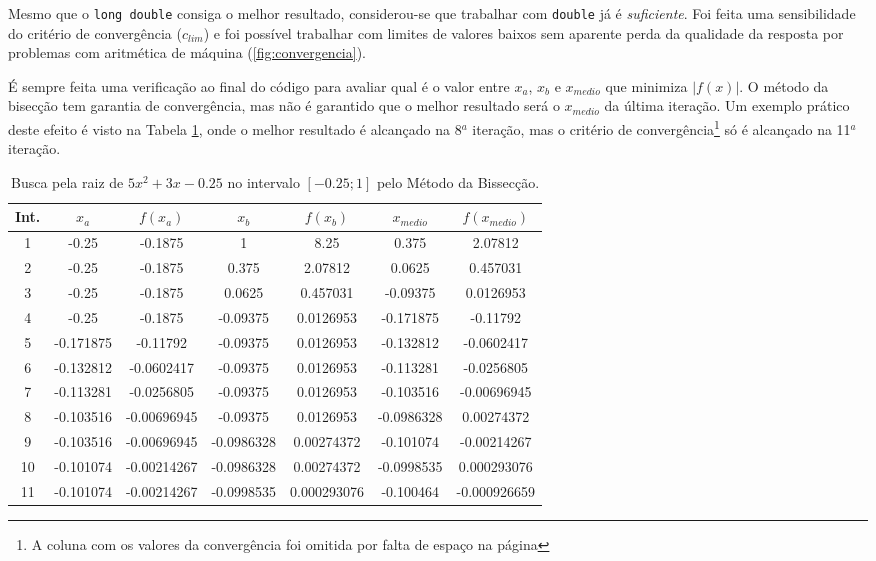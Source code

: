 \documentclass[final,3p,12pt]{elsarticle}
\begin{document}
    Mesmo que o \verb|long double| consiga o melhor resultado, considerou-se que trabalhar com \verb|double| já é \emph{suficiente}. Foi feita uma sensibilidade do critério de convergência ($c_{lim}$) e foi possível trabalhar com limites de valores baixos sem aparente perda da qualidade da resposta por problemas com aritmética de máquina (\ref{fig:convergencia}).

    É sempre feita uma verificação ao final do código para avaliar qual é o valor entre $x_a$, $x_b$ e $x_{medio}$ que minimiza $|f(x)|$. O método da bisecção tem garantia de convergência, mas não é garantido que o melhor resultado será o $x_{medio}$ da última iteração. Um exemplo prático deste efeito é visto na Tabela \ref{tab:fquad}, onde o melhor resultado é alcançado na 8$^a$ iteração, mas o critério de convergência\footnote{A coluna com os valores da convergência foi omitida por falta de espaço na página} só é alcançado na 11$^a$ iteração.
    
    \begin{table}[h!] 
        \centering
        \begin{tabular}{ c c c c c c c }
            Int. & $x_a$   & $f(x_a)$    & $x_b$      & $f(x_b)$    & $x_{medio}$ & $f(x_{medio})$  \\
            \hline
             1 &     -0.25 &     -0.1875 &          1 &        8.25 &      0.375 &     2.07812   \\
             2 &     -0.25 &     -0.1875 &      0.375 &     2.07812 &     0.0625 &    0.457031   \\
             3 &     -0.25 &     -0.1875 &     0.0625 &    0.457031 &   -0.09375 &   0.0126953   \\
             4 &     -0.25 &     -0.1875 &   -0.09375 &   0.0126953 &  -0.171875 &    -0.11792   \\
             5 & -0.171875 &    -0.11792 &   -0.09375 &   0.0126953 &  -0.132812 &  -0.0602417   \\
             6 & -0.132812 &  -0.0602417 &   -0.09375 &   0.0126953 &  -0.113281 &  -0.0256805   \\
             7 & -0.113281 &  -0.0256805 &   -0.09375 &   0.0126953 &  -0.103516 & -0.00696945   \\
             8 & -0.103516 & -0.00696945 &   -0.09375 &   0.0126953 & -0.0986328 &  0.00274372   \\
             9 & -0.103516 & -0.00696945 & -0.0986328 &  0.00274372 &  -0.101074 & -0.00214267   \\
            10 & -0.101074 & -0.00214267 & -0.0986328 &  0.00274372 & -0.0998535 & 0.000293076   \\
            11 & -0.101074 & -0.00214267 & -0.0998535 & 0.000293076 &  -0.100464 & -0.000926659 
        \end{tabular}
        \caption{Busca pela raiz de $5x^2+3x-0.25$ no intervalo $[-0.25; 1]$ pelo Método da Bissecção.}
        \label{tab:fquad}
    \end{table}
    
\end{document}
